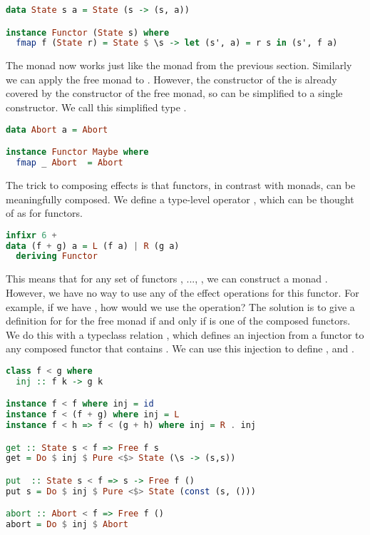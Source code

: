 \begin{lstlisting}[language=haskell,style=fancy]
data State s a = State (s -> (s, a))

instance Functor (State s) where
  fmap f (State r) = State $ \s -> let (s', a) = r s in (s', f a)
\end{lstlisting}

The  monad now works just like the  monad from the previous section. Similarly we can apply the free monad to . However, the  constructor of the  is already covered by the  constructor of the free monad, so  can be simplified to a single constructor. We call this simplified type .

\begin{lstlisting}[language=haskell,style=fancy]
data Abort a = Abort

instance Functor Maybe where
  fmap _ Abort  = Abort
\end{lstlisting}

The trick to composing effects is that functors, in contrast with monads, can be meaningfully composed. We define a type-level operator \hs{+}, which can be thought of as  for functors.

\begin{lstlisting}[language=haskell,style=fancy]
infixr 6 +
data (f + g) a = L (f a) | R (g a)
  deriving Functor
\end{lstlisting}

This means that for any set of functors , ..., , we can construct a monad . However, we have no way to use any of the effect operations for this functor. For example, if we have , how would we use the  operation? The solution is to give a definition for  for the free monad if and only if  is one of the composed functors. We do this with a typeclass relation \hs{<}, which defines an injection from a functor  to any composed functor  that contains . We can use this injection to define ,  and .

\begin{lstlisting}[language=haskell,style=fancy]
class f < g where
  inj :: f k -> g k

instance f < f where inj = id
instance f < (f + g) where inj = L
instance f < h => f < (g + h) where inj = R . inj

get :: State s < f => Free f s
get = Do $ inj $ Pure <$> State (\s -> (s,s))

put  :: State s < f => s -> Free f ()
put s = Do $ inj $ Pure <$> State (const (s, ()))

abort :: Abort < f => Free f ()
abort = Do $ inj $ Abort
\end{lstlisting}

